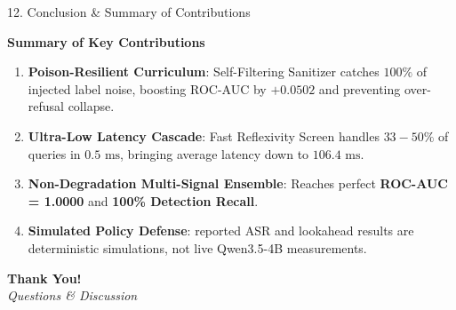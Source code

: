 \documentclass[aspectratio=169, 10pt]{beamer}
\begin{document}
\begin{frame}{12. Conclusion \& Summary of Contributions}
    \begin{center}
    \Large \textbf{Summary of Key Contributions}
    \end{center}
    \vspace{0.2cm}
    \begin{enumerate}
        \item \textbf{Poison-Resilient Curriculum}: Self-Filtering Sanitizer catches $100\%$ of injected label noise, boosting ROC-AUC by $+0.0502$ and preventing over-refusal collapse.
        \item \textbf{Ultra-Low Latency Cascade}: Fast Reflexivity Screen handles $33-50\%$ of queries in $0.5\text{ ms}$, bringing average latency down to $106.4\text{ ms}$.
        \item \textbf{Non-Degradation Multi-Signal Ensemble}: Reaches perfect \textbf{ROC-AUC = 1.0000} and \textbf{100\% Detection Recall}.
        \item \textbf{Simulated Policy Defense}: reported ASR and lookahead results are deterministic simulations, not live Qwen3.5-4B measurements.
    \end{enumerate}

    \vspace{0.4cm}
    \begin{center}
        \textbf{\large Thank You!}\\
        \vspace{0.1cm}
        \textit{Questions \& Discussion}
    \end{center}
\end{frame}

\end{document}
